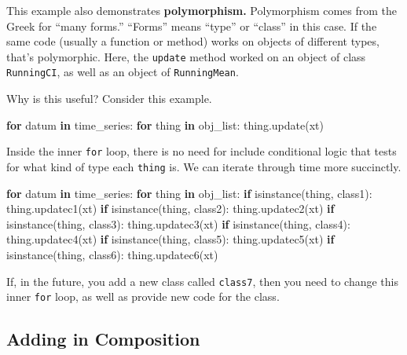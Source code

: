 \documentclass[
  12pt,
  krantz2]{krantz}
\makeatletter
\newenvironment{Shaded}{\begin{snugshade}}{\end{snugshade}}
\newcommand{\BuiltInTok}[1]{#1}
\newcommand{\ControlFlowTok}[1]{\textcolor[rgb]{0.27,0.27,0.27}{\textbf{#1}}}
\newcommand{\KeywordTok}[1]{\textcolor[rgb]{0.27,0.27,0.27}{\textbf{#1}}}
\newcommand{\NormalTok}[1]{#1}
\newenvironment{kframe}{%
\medskip{}
\setlength{\fboxsep}{.8em}
 \def\at@end@of@kframe{}%
 \ifinner\ifhmode%
  \def\at@end@of@kframe{\end{minipage}}%
  \begin{minipage}{\columnwidth}%
 \fi\fi%
 \def\FrameCommand##1{\hskip\@totalleftmargin \hskip-\fboxsep
 \colorbox{shadecolor}{##1}\hskip-\fboxsep
     \hskip-\linewidth \hskip-\@totalleftmargin \hskip\columnwidth}%
 \MakeFramed {\advance\hsize-\width
   \@totalleftmargin\z@ \linewidth\hsize
   \@setminipage}}%
 {\par\unskip\endMakeFramed%
 \at@end@of@kframe}
\renewenvironment{Shaded}{\begin{kframe}}{\end{kframe}}
\makeatother
\begin{document}
This example also demonstrates \textbf{polymorphism.} Polymorphism comes from the Greek for ``many forms.'' ``Forms'' means ``type'' or ``class'' in this case. If the same code (usually a function or method) works on objects of different types, that's polymorphic. Here, the \texttt{update} method worked on an object of class \texttt{RunningCI}, as well as an object of \texttt{RunningMean}.

Why is this useful? Consider this example.

\begin{Shaded}
\begin{Highlighting}[]
\ControlFlowTok{for}\NormalTok{ datum }\KeywordTok{in}\NormalTok{ time\_series:}
  \ControlFlowTok{for}\NormalTok{ thing }\KeywordTok{in}\NormalTok{ obj\_list:}
\NormalTok{    thing.update(xt)}
\end{Highlighting}
\end{Shaded}

Inside the inner \texttt{for} loop, there is no need for include conditional logic that tests for what kind of type each \texttt{thing} is. We can iterate through time more succinctly.

\begin{Shaded}
\begin{Highlighting}[]
\ControlFlowTok{for}\NormalTok{ datum }\KeywordTok{in}\NormalTok{ time\_series:}
  \ControlFlowTok{for}\NormalTok{ thing }\KeywordTok{in}\NormalTok{ obj\_list:}
    \ControlFlowTok{if} \BuiltInTok{isinstance}\NormalTok{(thing, class1):}
\NormalTok{      thing.updatec1(xt)}
    \ControlFlowTok{if} \BuiltInTok{isinstance}\NormalTok{(thing, class2):}
\NormalTok{      thing.updatec2(xt)}
    \ControlFlowTok{if} \BuiltInTok{isinstance}\NormalTok{(thing, class3):}
\NormalTok{      thing.updatec3(xt)}
    \ControlFlowTok{if} \BuiltInTok{isinstance}\NormalTok{(thing, class4):}
\NormalTok{      thing.updatec4(xt)}
    \ControlFlowTok{if} \BuiltInTok{isinstance}\NormalTok{(thing, class5):}
\NormalTok{      thing.updatec5(xt)}
    \ControlFlowTok{if} \BuiltInTok{isinstance}\NormalTok{(thing, class6):}
\NormalTok{      thing.updatec6(xt)}
\end{Highlighting}
\end{Shaded}

If, in the future, you add a new class called \texttt{class7}, then you need to change this inner \texttt{for} loop, as well as provide new code for the class.

\hypertarget{adding-in-composition}{%
\subsection{Adding in Composition}\label{adding-in-composition}}
\end{document}
